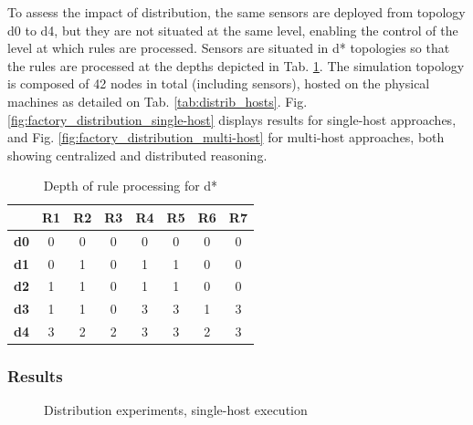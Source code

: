 \documentclass[sw]{iosart2x}
\begin{document}
To assess the impact of distribution, the same sensors are deployed from topology d0 to d4, but they are not situated at the same level, enabling the control of the level at which rules are processed.
Sensors are situated in d* topologies so that the rules are processed at the depths depicted in Tab. \ref{tab:factory_distrib_topologies}.
The simulation topology is composed of 42 nodes in total (including sensors), hosted on the physical machines as detailed on Tab. \ref{tab:distrib_hosts}.
Fig. \ref{fig:factory_distribution_single-host} displays results for single-host approaches, and Fig. \ref{fig:factory_distribution_multi-host} for multi-host approaches, both showing centralized and distributed reasoning. 

\begin{table}
	\centering
	\caption{Depth of rule processing for d*}
	\label{tab:factory_distrib_topologies}
	\begin{tabular}{|c|c|c|c|c|c|c|c|}
		\hline
		&\textbf{R1}&\textbf{R2}&\textbf{R3}&\textbf{R4}&\textbf{R5}&\textbf{R6}&\textbf{R7}\\ \hline
		\textbf{d0}& 0& 0& 0& 0& 0& 0& 0\\ \hline
		\textbf{d1}& 0& 1& 0& 1& 1& 0& 0\\ \hline
		\textbf{d2}& 1& 1& 0& 1& 1& 0& 0\\ \hline
		\textbf{d3}& 1& 1& 0& 3& 3& 1& 3\\ \hline
		\textbf{d4}& 3& 2& 2& 3& 3& 2& 3\\ \hline
	\end{tabular}
\end{table}

\subsubsection{Results}

\begin{figure}
	\Centering
	\caption{\Centering Distribution experiments, single-host execution}
	\label{fig:factory_distribution_single-host}
	\begin{minipage}{0.395\textwidth}
		\Centering
		\label{fig:factory_distribution_raw_syn}
		\scalebox{0.8}{
			
		}
	
	\end{minipage}
	\begin{minipage}{0.595\textwidth}
		\Centering
		\label{fig:factory_distribution_processed_syn}
		\scalebox{0.8}{
			
		}
	\end{minipage}
\end{figure}
	
\end{document}
